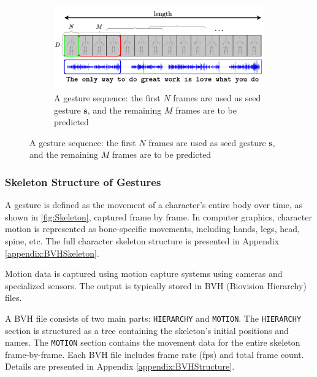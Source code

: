 \begin{figure}[h]
\begin{subfigure}{0.2\linewidth}
		\label{fig:Skeleton}
	\end{subfigure}
	\hfill
	\begin{subfigure}{0.75\linewidth}
			\centering
			\includegraphics[width=\linewidth]{figures/FeatureProcessing}
			\caption{A gesture sequence: the first $N$ frames are used as seed gesture $\mathbf{s}$, and the remaining $M$ frames are to be predicted}
			\label{fig:GestureSeries}
	\end{subfigure}
\end{figure}


\subsubsection{Skeleton Structure of Gestures}

A gesture is defined as the movement of a character's entire body over time, as shown in \autoref{fig:Skeleton}, captured frame by frame. In computer graphics, character motion is represented as bone-specific movements, including hands, legs, head, spine, etc. The full character skeleton structure is presented in Appendix \autoref{appendix:BVHSkeleton}.

Motion data is captured using motion capture systems using cameras and specialized sensors. The output is typically stored in BVH (Biovision Hierarchy) files.

A BVH file consists of two main parts: \texttt{HIERARCHY} and \texttt{MOTION}. The \texttt{HIERARCHY} section is structured as a tree containing the skeleton’s initial positions and names. The \texttt{MOTION} section contains the movement data for the entire skeleton frame-by-frame. Each BVH file includes frame rate (fps) and total frame count. Details are presented in Appendix \autoref{appendix:BVHStructure}.


